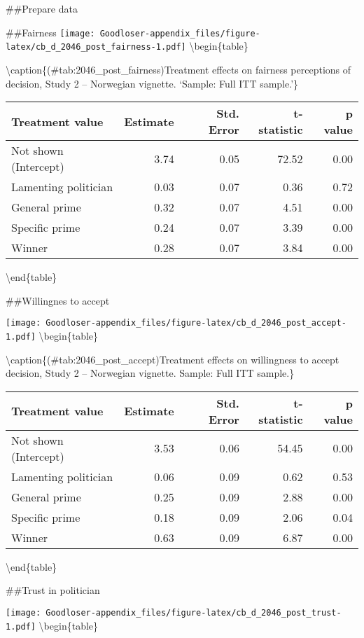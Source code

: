 \documentclass[
]{book}
\begin{document}
\#\#Prepare data

\#\#Fairness
\texttt{[image: Goodloser-appendix\_files/figure-latex/cb\_d\_2046\_post\_fairness-1.pdf]} \textbackslash begin\{table\}

\textbackslash caption\{(\#tab:2046\_post\_fairness)Treatment effects on fairness perceptions of decision, Study 2 -- Norwegian vignette. `Sample: Full ITT sample.'\}
\centering

\begin{tabular}[t]{lrrrr}
\toprule
Treatment value & Estimate & Std. Error & t-statistic & p value\\
\midrule
Not shown (Intercept) & 3.74 & 0.05 & 72.52 & 0.00\\
Lamenting politician & 0.03 & 0.07 & 0.36 & 0.72\\
General prime & 0.32 & 0.07 & 4.51 & 0.00\\
Specific prime & 0.24 & 0.07 & 3.39 & 0.00\\
Winner & 0.28 & 0.07 & 3.84 & 0.00\\
\bottomrule
\end{tabular}

\textbackslash end\{table\}

\#\#Willingnes to accept

\texttt{[image: Goodloser-appendix\_files/figure-latex/cb\_d\_2046\_post\_accept-1.pdf]} \textbackslash begin\{table\}

\textbackslash caption\{(\#tab:2046\_post\_accept)Treatment effects on willingness to accept decision, Study 2 -- Norwegian vignette. Sample: Full ITT sample.\}
\centering

\begin{tabular}[t]{lrrrr}
\toprule
Treatment value & Estimate & Std. Error & t-statistic & p value\\
\midrule
Not shown (Intercept) & 3.53 & 0.06 & 54.45 & 0.00\\
Lamenting politician & 0.06 & 0.09 & 0.62 & 0.53\\
General prime & 0.25 & 0.09 & 2.88 & 0.00\\
Specific prime & 0.18 & 0.09 & 2.06 & 0.04\\
Winner & 0.63 & 0.09 & 6.87 & 0.00\\
\bottomrule
\end{tabular}

\textbackslash end\{table\}

\#\#Trust in politician

\texttt{[image: Goodloser-appendix\_files/figure-latex/cb\_d\_2046\_post\_trust-1.pdf]} \textbackslash begin\{table\}
\end{document}
